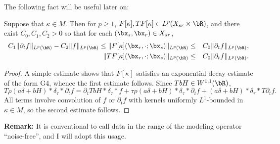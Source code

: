 The following fact will be useful later on:

\begin{prop}
  \label{thm:noisefree}
  Suppose that $\kappa \in M$. Then for $p \ge 1$, $F[\kappa], TF[\kappa]
  \in L^p(X_{sr} \times \bR)$, and there exist $C_0, C_1, C_2 >0$ so
  that for each $(\bx_s,\bx_r) \in X_{sr}$,
  \begin{eqnarray}
    \label{eqn:dnorms}
    C_1\|\partial_tf\|_{L^p(\bR)} - C_2\|f\|_{L^p(\bR)} \le \|F[\kappa](\bx_r,\cdot;\bx_s)\|_{L^p(\bR)} & \le & C_0\|\partial_tf\|_{L^p(\bR)}, \nonumber \\
    \|TF[\kappa](\bx_r,\cdot;\bx_s)\|_{L^p(\bR)} & \le & C_0\|\partial_tf\|_{L^p(\bR)}.
  \end{eqnarray}
\end{prop}

\begin{proof}
  A simple estimate shows that $F[\kappa]$ satisfies an exponential
  decay estimate of the form G4, whence the first estimate
  follows. Since $TbH \in W^{1,1}(\bR)$,
  \[
    T\rho(a\delta + bH)*\delta_{\tau}*\partial_t f = \partial_t TbH *
    \delta_{\tau} * f + \tau \rho (a\delta +
    bH)*\delta_{\tau}*\partial_t f  + (a\delta +
    bH)*\delta_{\tau}*T\partial_t f.
  \]
  All terms involve convolution of $f$ or $\partial_t f$ with kernels
  uniformly $L^1$-bounded in $\kappa \in M$, so the second estimate follows. 
\end{proof}

{\bf Remark:} It is conventional to call data in the range of the
modeling operator ``noise-free'', and I will adopt this usage.

